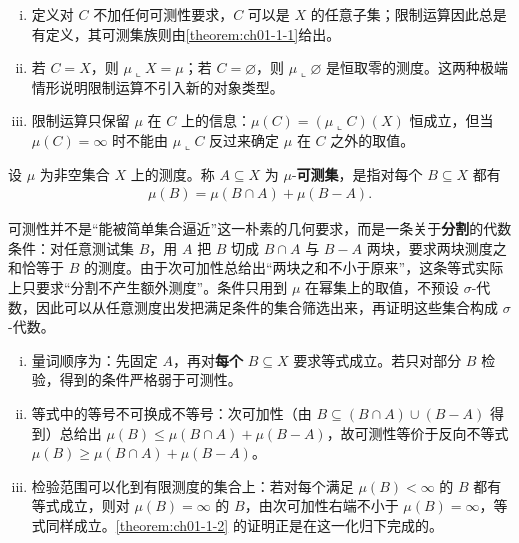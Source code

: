 \documentclass[../../main.tex]{subfiles}
\begin{document}
\begin{remark}\label{remark:ch01-def-1-2-限制条件}
\begin{enumerate}[(i)]
\item 定义对 $C$ 不加任何可测性要求，$C$ 可以是 $X$ 的任意子集；限制运算因此总是有定义，其可测集族则由\cref{theorem:ch01-1-1}给出。%
\item 若 $C=X$，则 $\mu\llcorner X=\mu$；若 $C=\varnothing$，则 $\mu\llcorner\varnothing$ 是恒取零的测度。这两种极端情形说明限制运算不引入新的对象类型。
\item 限制运算只保留 $\mu$ 在 $C$ 上的信息：$\mu(C)=(\mu\llcorner C)(X)$ 恒成立，但当 $\mu(C)=\infty$ 时不能由 $\mu\llcorner C$ 反过来确定 $\mu$ 在 $C$ 之外的取值。
\end{enumerate}
\end{remark}

\begin{definition}[$\mu$-可测集]\label{definition:ch01-1-3}
设 $\mu$ 为非空集合 $X$ 上的测度。称 $A\subseteq X$ 为 $\mu$-\textbf{可测集}，是指对每个 $B\subseteq X$ 都有
\begin{align*}
\mu(B)=\mu(B\cap A)+\mu(B-A).
\end{align*}
\end{definition}

\begin{remark}\label{remark:ch01-def-1-3-可测动机}
可测性并不是“能被简单集合逼近”这一朴素的几何要求，而是一条关于\textbf{分割}的代数条件：对任意测试集 $B$，用 $A$ 把 $B$ 切成 $B\cap A$ 与 $B-A$ 两块，要求两块测度之和恰等于 $B$ 的测度。由于次可加性总给出“两块之和不小于原来”，这条等式实际上只要求“分割不产生额外测度”。条件只用到 $\mu$ 在幂集上的取值，不预设 $\sigma$-代数，因此可以从任意测度出发把满足条件的集合筛选出来，再证明这些集合构成 $\sigma$-代数。
\end{remark}

\begin{remark}\label{remark:ch01-def-1-3-可测条件}
\begin{enumerate}[(i)]
\item 量词顺序为：先固定 $A$，再对\textbf{每个} $B\subseteq X$ 要求等式成立。若只对部分 $B$ 检验，得到的条件严格弱于可测性。
\item 等式中的等号不可换成不等号：次可加性（由 $B\subseteq(B\cap A)\cup(B-A)$ 得到）总给出 $\mu(B)\leqslant\mu(B\cap A)+\mu(B-A)$，故可测性等价于反向不等式 $\mu(B)\geqslant\mu(B\cap A)+\mu(B-A)$。
\item 检验范围可以化到有限测度的集合上：若对每个满足 $\mu(B)<\infty$ 的 $B$ 都有等式成立，则对 $\mu(B)=\infty$ 的 $B$，由次可加性右端不小于 $\mu(B)=\infty$，等式同样成立。\cref{theorem:ch01-1-2} 的证明正是在这一化归下完成的。%
\end{enumerate}
\end{remark}
\end{document}
